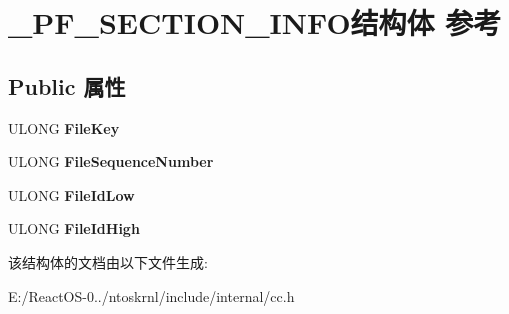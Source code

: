 \hypertarget{struct___p_f___s_e_c_t_i_o_n___i_n_f_o}{}\section{\+\_\+\+P\+F\+\_\+\+S\+E\+C\+T\+I\+O\+N\+\_\+\+I\+N\+F\+O结构体 参考}
\label{struct___p_f___s_e_c_t_i_o_n___i_n_f_o}
\subsection*{Public 属性}
\begin{DoxyCompactItemize}
\item 
\mbox{\label{struct___p_f___s_e_c_t_i_o_n___i_n_f_o_a8d5efcfc5aa30ad1185169813c615891}} 
U\+L\+O\+NG {\bfseries File\+Key}
\item 
\mbox{\label{struct___p_f___s_e_c_t_i_o_n___i_n_f_o_a88341e4213a5c1eddad08731a8dda216}} 
U\+L\+O\+NG {\bfseries File\+Sequence\+Number}
\item 
\mbox{\label{struct___p_f___s_e_c_t_i_o_n___i_n_f_o_a07eebaa2031013eaaf60b545a3dee0ec}} 
U\+L\+O\+NG {\bfseries File\+Id\+Low}
\item 
\mbox{\label{struct___p_f___s_e_c_t_i_o_n___i_n_f_o_ac70e1c471efdbccf3ee1592f6cd50ce5}} 
U\+L\+O\+NG {\bfseries File\+Id\+High}
\end{DoxyCompactItemize}


该结构体的文档由以下文件生成\+:\begin{DoxyCompactItemize}
\item 
E\+:/\+React\+O\+S-\/0../ntoskrnl/include/internal/cc.\+h\end{DoxyCompactItemize}
